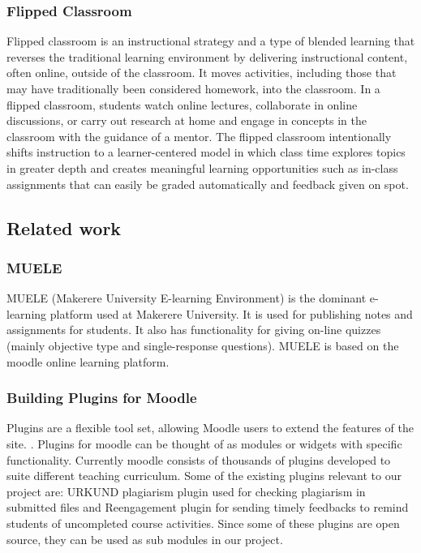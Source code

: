 \documentclass[12pt]{article}
\begin{document}
		\subsubsection{Flipped Classroom}
		Flipped classroom is an instructional strategy and a type of blended learning that reverses the traditional learning environment by delivering instructional content, often online, outside of the classroom. It moves activities, including those that may have traditionally been considered homework, into the classroom. In a flipped classroom, students watch online lectures, collaborate in online discussions, or carry out research at home and engage in concepts in the classroom with the guidance of a mentor. The flipped classroom intentionally shifts instruction to a learner-centered model in which class time explores topics in greater depth and creates meaningful learning opportunities such as in-class assignments that can easily be graded automatically and feedback given on spot.

	\subsection{Related work}
		\subsubsection{MUELE}
		MUELE (Makerere University E-learning Environment) \cite{muele} is the dominant e-learning platform used at Makerere University. It is used for publishing notes and assignments for students. It also has functionality for giving on-line quizzes (mainly objective type and single-response questions). MUELE is based on the moodle online learning platform.

		\subsubsection{Building Plugins for Moodle}
		Plugins are a flexible tool set, allowing Moodle users to extend the features of the site. \cite{moodle}. Plugins for moodle can be thought of as modules or widgets with specific functionality. Currently moodle consists of thousands of plugins developed to suite different teaching curriculum. Some of the existing plugins relevant to our project are: URKUND plagiarism plugin \cite{urkund} used for checking plagiarism in submitted files and Reengagement plugin \cite{reengagement} for sending timely feedbacks to remind students of uncompleted course activities. Since some of these plugins are open source, they can be used as sub modules in our project.\\
		
\end{document}
